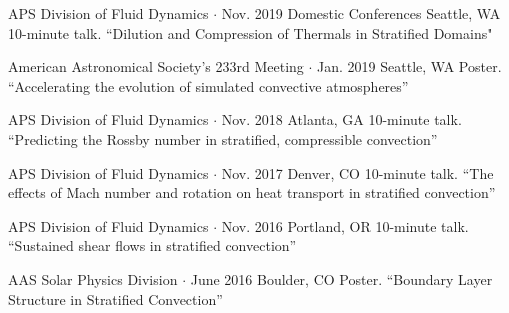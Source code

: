 \begin{cventries}

  \cventry
    {APS Division of Fluid Dynamics $\cdot$ Nov. 2019} %
    {Domestic Conferences} %
    {} %
    {Seattle, WA} %
    {10-minute talk. ``Dilution and Compression of Thermals in Stratified Domains"}

  \cventry
    {American Astronomical Society's 233rd Meeting $\cdot$ Jan. 2019} 
    {} 
    {} 
    {Seattle, WA} %
    {Poster. ``Accelerating the evolution of simulated convective atmospheres''} %

  \cventry
    {APS Division of Fluid Dynamics $\cdot$ Nov. 2018}
    {}
    {}
    {Atlanta, GA}
    {10-minute talk. ``Predicting the Rossby number in stratified, compressible convection''}

  \cventry
    {APS Division of Fluid Dynamics $\cdot$ Nov. 2017}
    {}
    {}
    {Denver, CO}
    {10-minute talk. ``The effects of Mach number and rotation on heat transport in stratified convection''}

  \cventry
    {APS Division of Fluid Dynamics $\cdot$ Nov. 2016}
    {}
    {}
    {Portland, OR}
    {10-minute talk. ``Sustained shear flows in stratified convection''}

  \cventry
    {AAS Solar Physics Division $\cdot$ June 2016}
    {}
    {}
    {Boulder, CO}
    {Poster. ``Boundary Layer Structure in Stratified Convection''}





\end{cventries}

